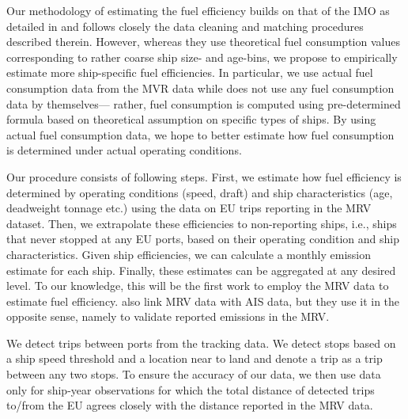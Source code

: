 \documentclass[hidelinks, 12pt,letterpaper]{article}
\begin{document}
Our methodology of estimating the fuel efficiency builds on that of the IMO as detailed in \citet{faber2020fourth} and follows closely the data cleaning and matching procedures described therein. However, whereas they use theoretical fuel consumption values corresponding to rather coarse ship size- and age-bins, we propose to empirically estimate more ship-specific fuel efficiencies. In particular, we use actual fuel consumption data  from the MVR data while  \citet{faber2020fourth} does not use any fuel consumption data  by themselves--- rather, fuel consumption is computed using pre-determined formula based on theoretical assumption on specific types of ships. By using actual fuel consumption data, we hope to better estimate how fuel consumption is determined under actual operating conditions. 


Our procedure consists of following steps. First, we estimate how fuel efficiency is determined by operating conditions (speed, draft) and ship characteristics (age, deadweight tonnage etc.) using the data on EU trips reporting in the MRV dataset. 
Then, we extrapolate these efficiencies to non-reporting ships, i.e., ships that never stopped at any EU ports, based on their operating condition and ship characteristics. Given ship efficiencies, we can calculate a monthly emission estimate for each ship. Finally, these estimates can be aggregated at any desired level. To our knowledge, this will be the first work to employ the MRV data to estimate fuel efficiency. \citet{uge2020estimation} also link MRV data with AIS data, but they use it in the opposite sense, namely to validate reported emissions in the MRV.

We detect trips between ports from the tracking data. We detect stops based on a ship speed threshold and a location near to land and denote a trip  as a trip between any two stops. To ensure the accuracy of our data, we then use data only for ship-year observations for which the total distance of detected trips to/from the EU agrees closely with the distance reported in the MRV data. %
\end{document}
